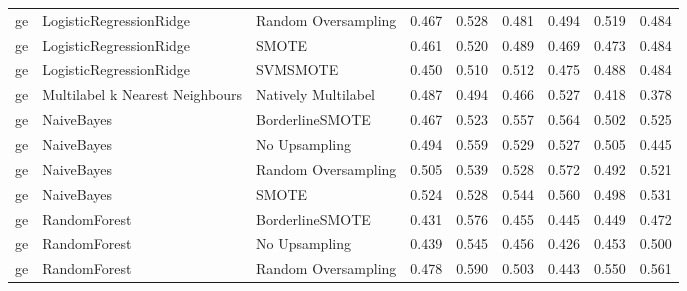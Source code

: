 \begin{tabular}{lllllllll}
      ge &         LogisticRegressionRidge &           Random Oversampling & 0.467 &                     0.528 &                 0.481 &                  0.494 &                                   0.519 &     0.484 \\
      ge &         LogisticRegressionRidge &                         SMOTE & 0.461 &                     0.520 &                 0.489 &                  0.469 &                                   0.473 &     0.484 \\
      ge &         LogisticRegressionRidge &                      SVMSMOTE & 0.450 &                     0.510 &                 0.512 &                  0.475 &                                   0.488 &     0.484 \\
      ge & Multilabel k Nearest Neighbours &           Natively Multilabel & 0.487 &                     0.494 &                 0.466 &                  0.527 &                                   0.418 &     0.378 \\
      ge &                      NaiveBayes &               BorderlineSMOTE & 0.467 &                     0.523 &                 0.557 &                  0.564 &                                   0.502 &     0.525 \\
      ge &                      NaiveBayes &                 No Upsampling & 0.494 &                     0.559 &                 0.529 &                  0.527 &                                   0.505 &     0.445 \\
      ge &                      NaiveBayes &           Random Oversampling & 0.505 &                     0.539 &                 0.528 &                  0.572 &                                   0.492 &     0.521 \\
      ge &                      NaiveBayes &                         SMOTE & 0.524 &                     0.528 &                 0.544 &                  0.560 &                                   0.498 &     0.531 \\
      ge &                    RandomForest &               BorderlineSMOTE & 0.431 &                     0.576 &                 0.455 &                  0.445 &                                   0.449 &     0.472 \\
      ge &                    RandomForest &                 No Upsampling & 0.439 &                     0.545 &                 0.456 &                  0.426 &                                   0.453 &     0.500 \\
      ge &                    RandomForest &           Random Oversampling & 0.478 &                     0.590 &                 0.503 &                  0.443 &                                   0.550 &     0.561 \\

\end{tabular}
